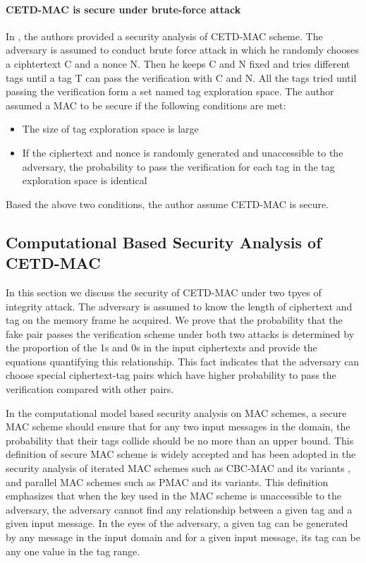 \paragraph{CETD-MAC is secure under brute-force attack}
In \cite{}, the authors provided a security analysis of CETD-MAC scheme. The adversary is assumed to conduct brute force attack in which he randomly chooses a ciphtertext C and a nonce N. Then he keeps C and N fixed and tries different tags until a tag T can pass the verification with C and N. All the tags tried until passing the verification form a set named tag exploration space. The author assumed a MAC to be secure if the following conditions are met:
\begin{itemize}
	\item The size of tag exploration space is large
	\item If the ciphertext and nonce is randomly generated and unaccessible to the adversary, the probability to pass the verification for each tag in the tag exploration space is identical
\end{itemize}
Based the above two conditions, the author assume CETD-MAC is secure.

\subsection{Computational Based Security Analysis of CETD-MAC}\label{sect:proportion}
In this section we discuss the security of CETD-MAC under two tpyes of integrity attack.  The adversary is assumed to know the length of ciphertext and tag on the memory frame he acquired. 
We prove that the probability that the fake pair passes the verification scheme under both two attacks is determined by the proportion of the 1s and 0s in the input ciphertexts and provide the equations quantifying this relationship. This fact indicates that the adversary can choose special ciphertext-tag pairs which have higher probability to pass the verification compared with other pairs.  

In the computational model based security analysis on MAC schemes, a secure MAC scheme should ensure that for any two input messages in the domain, the probability that their tags collide should be no more than an upper bound. This definition of secure MAC scheme is widely accepted and has been adopted in the security analysis of iterated MAC schemes such as CBC-MAC \cite{} and its variants \cite{}, and parallel MAC schemes such as PMAC \cite{} and its variants\cite{}. This definition emphasizes that when the key used in the MAC scheme is unaccessible to the adversary, the adversary cannot find any relationship between a given tag and a given input message. In the eyes of the adversary, a given tag can be generated by any message in the input domain and for a given input message, its tag can be any one value in the tag range. 
